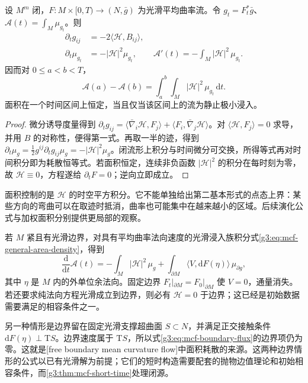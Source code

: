 \begin{proposition}\label{g3:prop:mcf-area-dissipation}
	设 \(M^m\) 闭，\(F:M\times[0,T)\to(N,\bar g)\) 为光滑平均曲率流。令 \(g_t=F_t^*\bar g\)、\(\mathcal A(t)=\int_M\mu_{g_t}\)。则
	\begin{align}
		\partial_tg_{ij}&=-2\langle\mathcal H,B_{ij}\rangle,
		\label{g3:eq:mcf-metric-evolution}\\
		\partial_t\mu_{g_t}&=-|\mathcal H|^2\mu_{g_t},\qquad
		\mathcal A'(t)=-\int_M|\mathcal H|^2\,\mu_{g_t}.
		\label{g3:eq:mcf-area-dissipation}
	\end{align}
	因而对 \(0\le a<b<T\)，
	\[
	\mathcal A(a)-\mathcal A(b)
	=\int_a^b\int_M|\mathcal H|^2\,\mu_{g_t}\,\mathrm dt.
	\]
	面积在一个时间区间上恒定，当且仅当该区间上的流为静止极小浸入。
\end{proposition}
\begin{proof}
	微分诱导度量得到
	\(\partial_tg_{ij}=\langle\bar\nabla_i\mathcal H,F_j\rangle+
	\langle F_i,\bar\nabla_j\mathcal H\rangle\)。对 \(\langle\mathcal H,F_j\rangle=0\) 求导，并用 \(B\) 的对称性，便得第一式。再取一半的迹，得到
	\(\partial_t\mu_g=\tfrac12g^{ij}\partial_tg_{ij}\mu_g=-|\mathcal H|^2\mu_g\)。闭流形上积分与时间微分可交换，所得等式再对时间积分即为耗散恒等式。若面积恒定，连续非负函数 \(|\mathcal H|^2\) 的积分在每时刻为零，故 \(\mathcal H\equiv0\)，方程遂给 \(\partial_tF=0\)；逆向立即成立。
\end{proof}

面积控制的是 \(\mathcal H\) 的时空平方积分。它不能单独给出第二基本形式的点态上界：某些方向的弯曲可以在取迹时抵消，曲率也可能集中在越来越小的区域。后续演化公式与加权面积分别提供更局部的观察。

\ProseParagraphBreak
若 \(M\) 紧且有光滑边界，对具有平均曲率法向速度的光滑浸入族积分式\eqref{g3:eq:mcf-general-area-density}，得到
\begin{equation}\label{g3:eq:mcf-boundary-flux}
	\frac{\mathrm d}{\mathrm dt}\mathcal A(t)
	=-\int_M|\mathcal H|^2\,\mu_g
	+\int_{\partial M}\langle V,\mathrm dF(\eta)\rangle\,\mu_{\partial g},
\end{equation}
其中 \(\eta\) 是 \(M\) 内的外单位余法向。固定边界 \(F_t|_{\partial M}=F_0|_{\partial M}\) 使 \(V=0\)，通量消失。若还要求纯法向方程光滑成立到边界，则必有 \(\mathcal H=0\) 于边界；这已经是初始数据需要满足的相容条件之一。

\ProseParagraphBreak
另一种情形是边界留在固定光滑支撑超曲面 \(S\subset N\)，并满足正交接触条件 \(\mathrm dF(\eta)\perp\mathrm TS\)。边界速度属于 \(\mathrm TS\)，所以式\eqref{g3:eq:mcf-boundary-flux}的边界项仍为零。这就是[free boundary mean curvature flow]中面积耗散的来源。这两种边界情形的公式以已有光滑解为前提；它们的短时构造需要配套的抛物边值理论和初始相容条件，而\cref{g3:thm:mcf-short-time}处理闭源。

